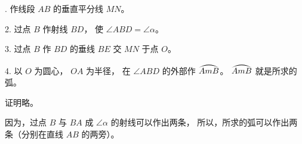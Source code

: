 . 作线段 $AB$ 的垂直平分线 $MN$。

2. 过点 $B$ 作射线 $BD$， 使 $\angle ABD = \angle \alpha$。

3. 过点 $B$ 作 $BD$ 的垂线 $BE$ 交 $MN$ 于点 $O$。

4. 以 $O$ 为圆心， $OA$ 为半径， 在 $\angle ABD$ 的外部作 $\yuanhu{AmB}$。
$\yuanhu{AmB}$ 就是所求的弧。

证明略。

因为，过点 $B$ 与 $BA$ 成 $\angle \alpha$ 的射线可以作出两条，
所以，所求的弧可以作出两条（分别在直线 $AB$ 的两旁）。


\begin{lianxi}



\end{lianxi}

